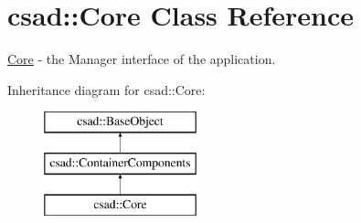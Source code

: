 \hypertarget{classcsad_1_1_core}{\section{csad\-:\-:Core Class Reference}
\label{classcsad_1_1_core}
}


\hyperlink{classcsad_1_1_core}{Core} -\/ the Manager interface of the application.  


Inheritance diagram for csad\-:\-:Core\-:\begin{figure}[H]
\begin{center}
\leavevmode
\includegraphics[height=3.000000cm]{classcsad_1_1_core}
\end{center}
\end{figure}
